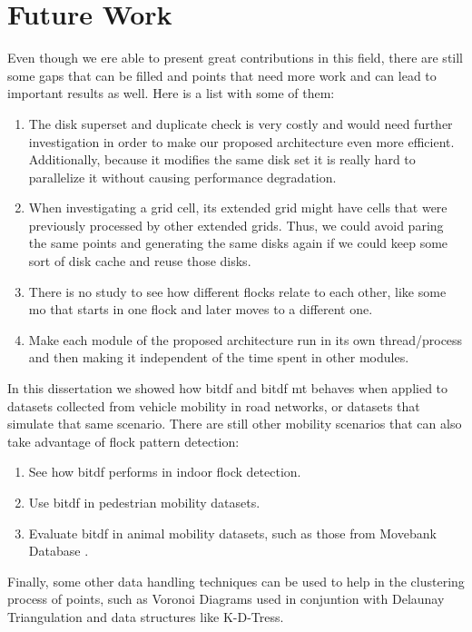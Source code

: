 \section{Future Work}
Even though we ere able to present great contributions in this field, there are still some gaps that can be filled and
points that need more work and can lead to important results as well. Here is a list with some of them:

\begin{enumerate}
    \item The disk superset and duplicate check is very costly and would need further investigation in order to make our
        proposed architecture even more efficient. Additionally, because it modifies the same disk set it is really hard
        to parallelize it without causing performance degradation.
    \item When investigating a grid cell, its extended grid might have cells that were previously processed by other
        extended grids. Thus, we could avoid paring the same points and generating the same disks again if we could keep
        some sort of disk cache and reuse those disks.
    \item There is no study to see how different flocks relate to each other, like some \ac{mo} that starts in one flock
        and later moves to a different one.
    \item Make each module of the proposed architecture run in its own thread/process and then making it independent of
        the time spent in other modules.
\end{enumerate}

In this dissertation we showed how \ac{bitdf} and \ac{bitdf} \ac{mt} behaves when applied to datasets collected from
vehicle mobility in road networks, or datasets that simulate that same scenario. There are still other mobility
scenarios that can also take advantage of flock pattern detection:

\begin{enumerate}
    \item See how \ac{bitdf} performs in indoor flock detection.
    \item Use \ac{bitdf} in pedestrian mobility datasets.
    \item Evaluate \ac{bitdf} in animal mobility datasets, such as those from Movebank Database \citep{movebank}.
\end{enumerate}

Finally, some other data handling techniques can be used to help in the clustering process of points, such as Voronoi
Diagrams used in conjuntion with Delaunay Triangulation and data structures like K-D-Tress.

